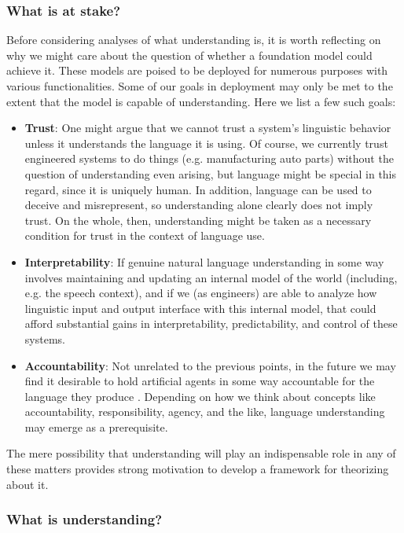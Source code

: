 \subsubsection{What is at stake?}

Before considering analyses of what understanding is, it is worth reflecting on why we might care about the question of whether a foundation model could achieve it. These models are poised to be deployed for numerous purposes with various functionalities. Some of our goals in deployment may only be met to the extent that the model is capable of understanding. Here we list a few such goals:

\begin{itemize}
    \item \textbf{Trust}: One might argue that we cannot trust a system’s linguistic behavior unless it understands the language it is using. Of course, we currently trust engineered systems to do things (e.g. manufacturing auto parts) without the question of understanding even arising, but language might be special in this regard, since it is uniquely human. In addition, language can be used to deceive and misrepresent, so understanding alone clearly does not imply trust. On the whole, then, understanding might be taken as a necessary condition for trust in the context of language use.
    \item \textbf{Interpretability}: If genuine natural language understanding in some way involves maintaining and updating an internal model of the world (including, e.g. the speech context), and if we (as engineers) are able to analyze how linguistic input and output interface with this internal model, that could afford substantial gains in interpretability, predictability, and control of these systems.
    \item \textbf{Accountability}: Not unrelated to the previous points, in the future we may find it desirable to hold artificial agents in some way accountable for the language they produce \citep{thehaiadaptiveagentsgroup2021when}. Depending on how we think about concepts like accountability, responsibility, agency, and the like, language understanding may emerge as a prerequisite.
\end{itemize}

 The mere possibility that understanding will play an indispensable role in any of these matters provides strong motivation to develop a framework for theorizing about it. 

\subsubsection{What is understanding?}

